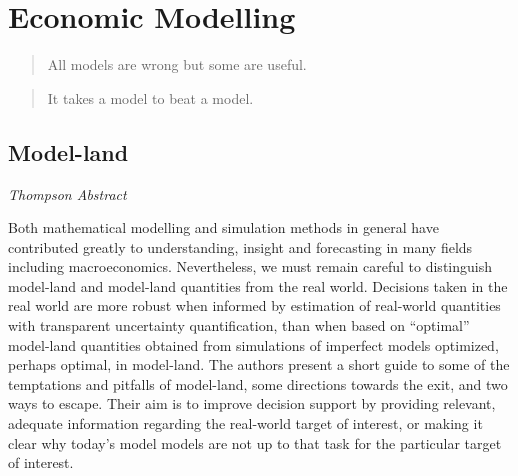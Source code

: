 \documentclass[
]{book}
\begin{document}
\hypertarget{economic-modelling}{%
\chapter{Economic Modelling}\label{economic-modelling}}

\begin{quote}
All models are wrong but some are useful.
\end{quote}

\begin{quote}
It takes a model to beat a model.
\end{quote}

\hypertarget{model-land}{%
\section{Model-land}\label{model-land}}

\emph{Thompson Abstract}

Both mathematical modelling and simulation methods in general have contributed greatly
to understanding, insight and forecasting in many fields including macroeconomics.
Nevertheless, we must remain careful to distinguish model-land and model-land quantities
from the real world. Decisions taken in the real world are more robust when informed by
estimation of real-world quantities with transparent uncertainty quantification, than when
based on ``optimal'' model-land quantities obtained from simulations of imperfect models
optimized, perhaps optimal, in model-land. The authors present a short guide to some
of the temptations and pitfalls of model-land, some directions towards the exit, and two
ways to escape. Their aim is to improve decision support by providing relevant, adequate
information regarding the real-world target of interest, or making it clear why today's
model models are not up to that task for the particular target of interest.
\end{document}
